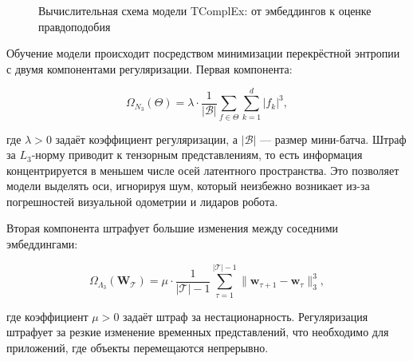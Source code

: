\begin{figure}[H]
{
}%
\caption{Вычислительная схема модели TComplEx: от эмбеддингов к оценке правдоподобия}
\label{fig:tcomplex_flow}
\end{figure}

\begin{sloppypar}
Обучение модели происходит посредством минимизации перекрёстной энтропии с двумя компонентами регуляризации. Первая компонента:
\end{sloppypar}

\begin{equation}
    \Omega_{N_3}(\Theta) = \lambda \cdot \frac{1}{|\mathcal{B}|} \sum_{f \in \Theta} \sum_{k=1}^{d} |f_k|^3,
    \label{eq:n3_reg}
\end{equation}

где $\displaystyle \lambda > 0$ задаёт коэффициент регуляризации, а $\displaystyle |\mathcal{B}|$ — размер мини-батча. Штраф за $L_3$-норму приводит к тензорным представлениям, то есть информация концентрируется в меньшем числе осей латентного пространства. Это позволяет модели выделять оси, игнорируя шум, который неизбежно возникает из-за погрешностей визуальной одометрии и лидаров робота.

Вторая компонента штрафует большие изменения между соседними эмбеддингами:

\begin{equation}
    \Omega_{\Lambda_3}(\mathbf{W}_\mathcal{T}) = \mu \cdot \frac{1}{|\mathcal{T}|-1} \sum_{\tau=1}^{|\mathcal{T}|-1} \|\mathbf{w}_{\tau+1} - \mathbf{w}_\tau\|_3^3,
    \label{eq:lambda3_reg}
\end{equation}

где коэффициент $\displaystyle \mu > 0$ задаёт штраф за нестационарность. Регуляризация штрафует за резкие изменение временных представлений, что необходимо для приложений, где объекты перемещаются непрерывно.

